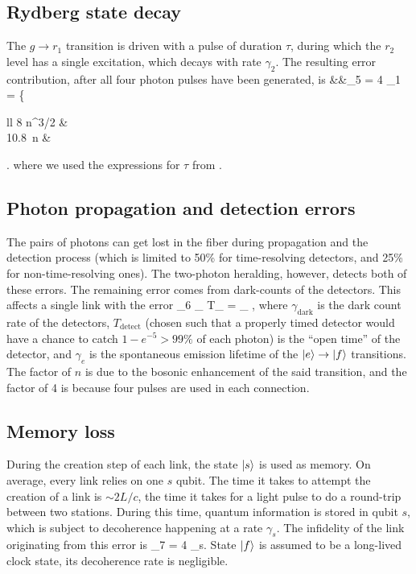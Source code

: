 \subsection{Rydberg state decay}
The $g\rightarrow r_1$ transition is driven with a pulse of duration $\tau$,
during which the $r_2$ level has a single excitation, which decays with rate
$\gamma_2$. The resulting error contribution, after all four photon pulses have
been generated, is
\bal
\label{eq:f5}
	&&\eps_5  = 4 \gamma_1 \tau = 
	\left\{
	\begin{array}{ll}
	8 n^{3/2}  & 
	\\
	10.8\, n  & 
	\end{array}
	\right.
\eal
where we used the expressions for $\tau$ from .

\subsection{Photon propagation and detection errors}
The pairs of photons can get lost in the fiber during propagation and the
detection process (which is limited to 50\% for time-resolving detectors,  and
25\% for non-time-resolving ones). The two-photon heralding, however, detects
both of these errors. The remaining error comes from dark-counts of the
detectors. This affects a single link with the error
\bel
\label{eq:f6}
	\eps_6  \gamma_
	T_ = \gamma_ ,
\eel
where $\gamma_\mathrm{dark}$ is the dark count rate of the detectors,
 $T_\mathrm{detect}$ (chosen such that a properly timed detector would have a
 chance to catch $1 -e^{-5} >  99\%$ of each photon) is the ``open time'' of the
 detector, and $\gamma_{e}$ is the spontaneous emission lifetime of the
 $| e \rangle\rightarrow | f \rangle$ transitions.
 The factor of $n$ is due to the bosonic enhancement of the said transition, and
 the factor of 4 is because four pulses are used in each connection.


\subsection{Memory loss}
During the creation step of each link, the state $| s \rangle$ is used as memory.
On average, every link relies on one $s$ qubit. The time it takes to attempt the
creation of a link is $\sim 2L/c$, the time it takes for a light pulse to do a
round-trip between two stations.
During this time, quantum information is stored in qubit $s$, which is subject
to decoherence happening at a rate $\gamma_s$.
The infidelity of the link originating from this error is
\bel
\label{eq:f7}
	\eps_7 = 4	\gamma_s.
\eel
State $| f \rangle$ is assumed to be a long-lived clock state, its decoherence rate
is negligible.

